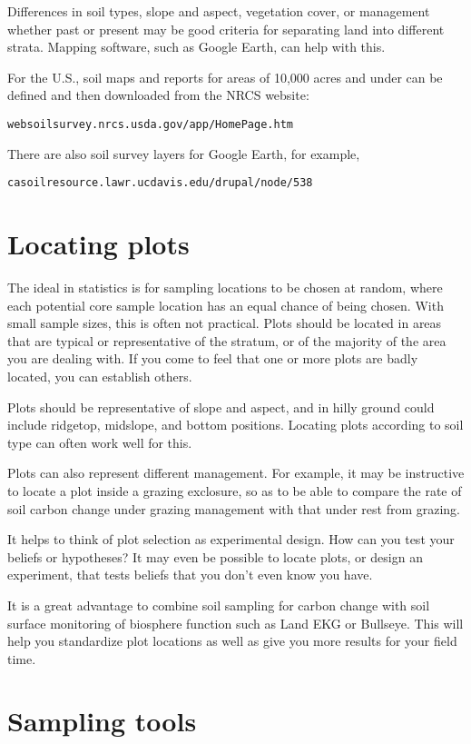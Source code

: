 \documentclass[11pt,letterpaper,oneside,onecolumn]{memoir}
\begin{document}
Differences in soil types, slope and aspect, vegetation cover, or management whether past or present may be good criteria for separating land into different strata. Mapping software, such as Google Earth, can help with this.

For the U.S., soil maps and reports for areas of 10,000 acres and under can be defined and then downloaded from the NRCS website:

\texttt{websoilsurvey.nrcs.usda.gov/app/HomePage.htm}

\noindent There are also soil survey layers for Google Earth, for example,

\texttt{casoilresource.lawr.ucdavis.edu/drupal/node/538}

\section{Locating plots}

The ideal in statistics is for sampling locations to be chosen at random, where each potential core sample location has an equal chance of being chosen. With small sample sizes, this is often not practical. Plots should be located in areas that are typical or representative of the stratum, or of the majority of the area you are dealing with. If you come to feel that one or more plots are badly located, you can establish others.

Plots should be representative of slope and aspect, and in hilly ground could include ridgetop, midslope, and bottom positions. Locating plots according to soil type can often work well for this.

Plots can also represent different management. For example, it may be instructive to locate a plot inside a grazing exclosure, so as to be able to compare the rate of soil carbon change under grazing management with that under rest from grazing.

It helps to think of plot selection as experimental design. How can you test your beliefs or hypotheses? It may even be possible to locate plots, or design an experiment, that tests beliefs that you don't even know you have.

It is a great advantage to combine soil sampling for carbon change with soil surface monitoring of biosphere function such as Land EKG or Bullseye. This will help you standardize plot locations as well as give you more results for your field time.

\section{Sampling tools}
\end{document}
